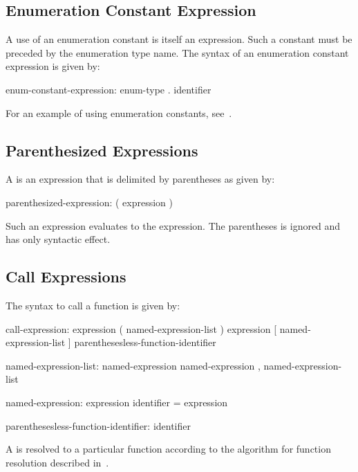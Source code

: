 \subsection{Enumeration Constant Expression}
\label{Enumeration_Constant_Expression}

A use of an enumeration constant is itself an expression.  Such a
constant must be preceded by the enumeration type name.  The syntax of
an enumeration constant expression is given by:
\begin{syntax}
enum-constant-expression:
  enum-type . identifier
\end{syntax}

\begin{example}
For an example of using enumeration constants,
see~.
\end{example}

\subsection{Parenthesized Expressions}
\label{Parenthesized_Expressions}

A  is an expression that is delimited
by parentheses as given by:
\begin{syntax}
parenthesized-expression:
  ( expression )
\end{syntax}
Such an expression evaluates to the expression.  The parentheses is
ignored and has only syntactic effect.

\subsection{Call Expressions}
\label{Call_Expressions}

The syntax to call a function is given by:
\begin{syntax}
call-expression:
  expression ( named-expression-list )
  expression [ named-expression-list ]
  parenthesesless-function-identifier

named-expression-list:
  named-expression
  named-expression , named-expression-list

named-expression:
  expression
  identifier = expression

parenthesesless-function-identifier:
  identifier
\end{syntax}

A  is resolved to a particular function
according to the algorithm for function resolution described
in~.

